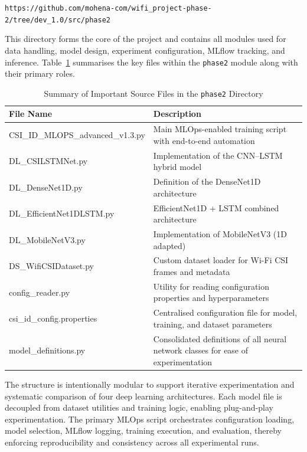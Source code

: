 \begin{center}
\texttt{https://github.com/mohena-com/wifi\_project-phase-2/tree/dev\_1.0/src/phase2}
\end{center}

This directory forms the core of the project and contains all modules used for data handling, model design, 
experiment configuration, MLflow tracking, and inference. Table~\ref{tab:phase2files} summarises the 
key files within the \texttt{phase2} module along with their primary roles.

\begin{table}[H]
\centering
\caption{Summary of Important Source Files in the \texttt{phase2} Directory}
\label{tab:phase2files}
\begin{tabular}{|l|l|}
\hline
\textbf{File Name} & \textbf{Description} \\ \hline

CSI\_ID\_MLOPS\_advanced\_v1.3.py 
& Main MLOps-enabled training script with end-to-end automation \\ \hline

DL\_CSILSTMNet.py 
& Implementation of the CNN--LSTM hybrid model \\ \hline

DL\_DenseNet1D.py 
& Definition of the DenseNet1D architecture \\ \hline

DL\_EfficientNet1DLSTM.py 
& EfficientNet1D + LSTM combined architecture \\ \hline

DL\_MobileNetV3.py 
& Implementation of MobileNetV3 (1D adapted) \\ \hline

DS\_WifiCSIDataset.py 
& Custom dataset loader for Wi-Fi CSI frames and metadata \\ \hline

config\_reader.py 
& Utility for reading configuration properties and hyperparameters \\ \hline

csi\_id\_config.properties 
& Centralised configuration file for model, training, and dataset parameters \\ \hline



model\_definitions.py 
& Consolidated definitions of all neural network classes for ease of experimentation \\ \hline

\end{tabular}
\end{table}

The structure is intentionally modular to support iterative experimentation and systematic comparison of four 
deep learning architectures. Each model file is decoupled from dataset utilities and training logic, enabling 
plug-and-play experimentation. The primary MLOps script orchestrates configuration loading, model selection, 
MLflow logging, training execution, and evaluation, thereby enforcing reproducibility and consistency across 
all experimental runs.
